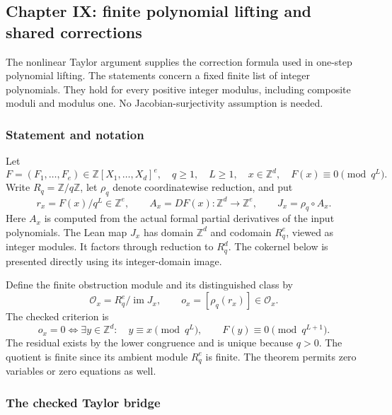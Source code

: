 \hypertarget{cont1:paper-ix-finite-polynomial-lifting-and-shared-corrections}{%
\subsection{Chapter IX: finite polynomial lifting and shared
corrections}\label{cont1:paper-ix-finite-polynomial-lifting-and-shared-corrections}}

The nonlinear Taylor argument supplies the correction formula used in
one-step polynomial lifting. The statements concern a fixed
finite list of integer polynomials. They hold for every positive integer
modulus, including composite moduli and modulus one. No
Jacobian-surjectivity assumption is needed.

\hypertarget{cont1:statement-and-notation}{%
\subsubsection{Statement and notation}\label{cont1:statement-and-notation}}

Let \[
F=(F_1,\ldots,F_e)\in\mathbb Z[X_1,\ldots,X_d]^e,
\quad q\ge1,\quad L\ge1,
\quad x\in\mathbb Z^d,
\quad F(x)\equiv0\pmod{q^L}.
\] Write \(R_q=\mathbb Z/q\mathbb Z\), let \(\rho_q\) denote
coordinatewise reduction, and put \[
r_x=F(x)/q^L\in\mathbb Z^e,
\qquad A_x=DF(x):\mathbb Z^d\longrightarrow\mathbb Z^e,
\qquad J_x=\rho_q\circ A_x.
\] Here \(A_x\) is computed from the actual formal partial derivatives
of the input polynomials. The Lean map \(J_x\) has domain
\(\mathbb Z^d\) and codomain \(R_q^e\), viewed as integer modules. It
factors through reduction to \(R_q^d\). The cokernel below is presented
directly using its integer-domain image.

Define the finite obstruction module and its distinguished class by \[
\mathcal O_x=R_q^e/\operatorname{im}J_x,
\qquad o_x=[\rho_q(r_x)]\in\mathcal O_x.
\] The checked criterion is \[
\boxed{
 o_x=0
 \iff
 \exists y\in\mathbb Z^d:\quad
 y\equiv x\pmod{q^L},\qquad F(y)\equiv0\pmod{q^{L+1}}.
}
\] The residual exists by the lower congruence and is unique because
\(q>0\). The quotient is finite since its ambient module \(R_q^e\) is
finite. The theorem permits zero variables or zero equations as well.

\hypertarget{cont1:the-checked-taylor-bridge}{%
\subsubsection{The checked Taylor
bridge}\label{cont1:the-checked-taylor-bridge}}

